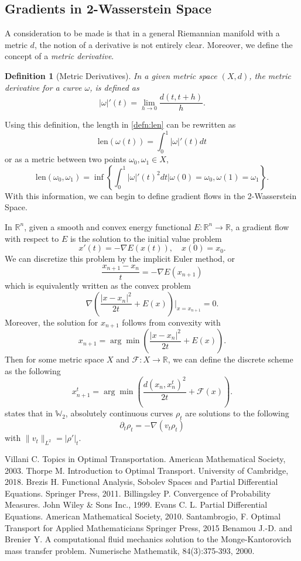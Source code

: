 \documentclass[12pt]{article}
\newcommand{\R}{\mathbb{R}}
\theoremstyle{plain}
\newtheorem{defn}{Definition}[section]
\numberwithin{equation}{section}
\begin{document}
\subsection{Gradients in 2-Wasserstein Space}


A consideration to be made is that in a general Riemannian manifold with a metric $d$, the notion of a derivative is not entirely clear. Moreover, we define the concept of a \textit{metric derivative}.
\begin{defn}[Metric Derivatives]
  In a given metric space $(X,d)$, the metric derivative for a curve $\omega$, is defined as
  \[|\omega|'(t) = \lim_{h\to 0}\frac{d(t,t+h)}{h}.\] 
\end{defn}
Using this definition, the length in \autoref{defn:len} can be rewritten as 
\[\text{len}(\omega(t)) = \int_0^1|\omega|'(t)dt\]
or as a metric between two points $\omega_0,\omega_1\in X$,
\[\text{len}(\omega_0,\omega_1) = \inf\left\{\int_0^1|\omega|'(t)^2dt \vert \omega(0) = \omega_0, \omega(1) = \omega_1\right\}.\]
With this information, we can begin to define gradient flows in the 2-Wasserstein Space.


In $\R^n$, given a smooth and convex energy functional $E: \R^n\to \R$, a gradient flow with respect to $E$ is the solution to the initial value problem 
\[x'(t) = -\nabla E(x(t)),\quad x(0) = x_0.\]
We can discretize this problem by the implicit Euler method, or 
\[\frac{x_{n+1}-x_n}{t} = - \nabla E(x_{n+1})\]
which is equivalently written as the convex problem 
\[\nabla\left(\frac{|x-x_n|^2}{2t} + E(x)\right)\bigg\vert_{x=x_{n+1}} = 0.\]
Moreover, the solution for $x_{n+1}$ follows from convexity with
\[x_{n+1} = \arg\min\left(\frac{|x-x_n|^2}{2t} + E(x)\right).\]
Then for some metric space $X$ and $\mathcal{F}: X\to \R$, we can define the discrete scheme as the following
\[x_{n+1}^t = \arg\min\left(\frac{d(x_n,x_n^t)^2}{2t} + \mathcal{F}(x)\right).\]
\cite{santambrogio} states that in $\mathbb{W}_2$, absolutely continuous curves $\rho_t$ are solutions to the following 
\[\partial_t \rho_t = -\nabla(v_t\rho_t) \]
with $\|v_t\|_{L^2} = |\rho'|_t$.

\begin{thebibliography}{9}
Villani C.
Topics in Optimal Transportation.
American Mathematical Society, 2003.
Thorpe M.
Introduction to Optimal Transport.
University of Cambridge, 2018.
Brezis H.
Functional Analysis, Sobolev Spaces and Partial Differential Equations. 
Springer Press, 2011.
Billingsley P.
Convergence of Probability Measures.
John Wiley \& Sons Inc., 1999.
Evans C. L.
Partial Differential Equations.
American Mathematical Society, 2010.
Santambrogio, F.
Optimal Transport for Applied Mathematicians
Springer Press, 2015
Benamou J.-D. and Brenier Y. 
A computational fluid mechanics solution to the Monge-Kantorovich mass transfer problem.
Numerische Mathematik, 84(3):375-393, 2000.
\end{thebibliography}
\end{document}
